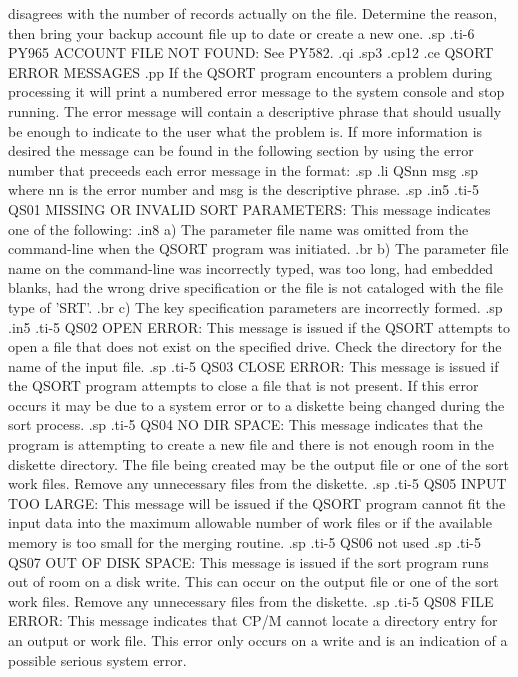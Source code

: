 disagrees with the number of records actually on the file.  Determine the
reason, then bring your backup account file up to date or create a new one.
.sp
.ti-6
PY965 ACCOUNT FILE NOT FOUND: See PY582.
.qi
.sp3
.cp12
.ce
QSORT ERROR MESSAGES
.pp
If the QSORT program encounters a problem during processing it will print
a numbered error message to the system console and stop running.  The error
message will contain a descriptive phrase that should usually be enough to
indicate to the user what the problem is.  If more information is desired
the message can be found in the following section by using the error number
that preceeds each error message in the format:
.sp
.li
	QSnn   msg
.sp
where nn is the error number and msg is the descriptive phrase.
.sp
.in5
.ti-5
QS01 MISSING OR INVALID SORT PARAMETERS:
This message indicates one of the following:
.in8
a) The parameter file name was omitted from the command-line when
the QSORT program was initiated.
.br
b) The parameter file name on the command-line was incorrectly
typed, was too long, had embedded blanks, had the wrong drive
specification or the file is not cataloged with the file type
of 'SRT'.
.br
c) The key specification parameters are incorrectly formed.
.sp
.in5
.ti-5
QS02 OPEN ERROR:
This message is issued if the QSORT attempts to open a file that does not
exist on the specified drive.  Check the directory for the name of the
input file.
.sp
.ti-5
QS03 CLOSE ERROR:
This message is issued if the QSORT program attempts to close a file that
is not present.  If this error occurs it may be due to a system error or
to a diskette being changed during the sort process.
.sp
.ti-5
QS04 NO DIR SPACE:
This message indicates that the program is attempting to create a new file
and there is not enough room in the diskette directory.  The file being
created may be the output file or one of the sort work files.  Remove any
unnecessary files from the diskette.
.sp
.ti-5
QS05 INPUT TOO LARGE:
This message will be issued if the QSORT program cannot fit the input
data into the maximum allowable number of work files or if the available
memory is too small for the merging routine.
.sp
.ti-5
QS06 not used
.sp
.ti-5
QS07 OUT OF DISK SPACE:
This message is issued if the sort program runs out of room on a disk write.
This can occur on the output file or one of the sort work files.  Remove any
unnecessary files from the diskette.
.sp
.ti-5
QS08 FILE ERROR:
This message indicates that CP/M cannot locate a directory entry for an output
or work file.  This error only occurs on a write and is an indication of a
possible serious system error.
